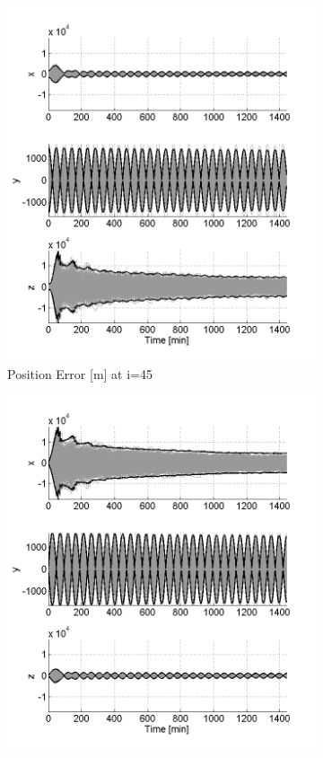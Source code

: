 \documentclass[]{aiaa-tc}%
\begin{document}
%
%
\begin{figure}[h!]
	\centering
	\begin{subfigure}{.49\textwidth}
		\centering
		\includegraphics{MC_pos45_500}
		\caption{Position Error [m] at i=45\degree}
		\label{fig:mcpos45_500}
	\end{subfigure}%
	\begin{subfigure}{.49\textwidth} 
		\centering
		\includegraphics{MC_vel45_500}

\end{subfigure}
\end{figure}
\end{document}
